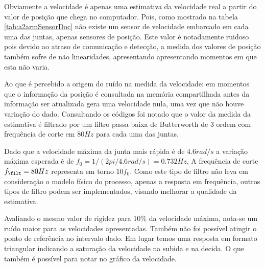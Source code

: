Obviamente a velocidade é apenas uma estimativa da velocidade real a partir do valor de posição que chega no computador. Pois, como mostrado na tabela \ref{tab:a2armSensorDoc} não existe um sensor de velocidade embarcado em cada uma das juntas, apenas sensores de posição. Este valor é notadamente ruidoso pois devido ao atraso de comunicação e detecção, a medida dos valores de posição também sofre de não linearidades, apresentando apresentando momentos em que esta não varia.

Ao que é percebido a origem do ruído na medida da velocidade: em momentos que o informação da posição é consultada na memória compartilhada antes da informação ser atualizada gera uma velocidade nula, uma vez que não houve variação do dado. Consultando os códigos foi notado que o valor da medida da estimativa é filtrado por um filtro passa baixa de Butterworth de 3 ordem com frequência de corte em $80 Hz$ para cada uma das juntas.


Dado que a velocidade máxima da junta mais rápida é de $4.6 rad/s$ a variação máxima esperada é de $f_0 = 1/(2pi/4.6 rad/s) = 0.732 Hz$, A frequência de corte $f_{\filt} = 80Hz$ representa em torno $10 f_0$. Como este tipo de filtro não leva em consideração o modelo físico do processo, apenas a resposta em frequência, outros tipos de filtro podem ser implementados, visando melhorar a qualidade da estimativa.

Avaliando o mesmo valor de rigidez para $10\%$ da velocidade máxima, nota-se um ruído maior para as velocidades apresentadas. Também não foi possível atingir o ponto de referência no intervalo dado. Em lugar temos uma resposta em formato triangular indicando a saturação da velocidade na subida e na decida. O que também é possível para notar no gráfico da velocidade.

